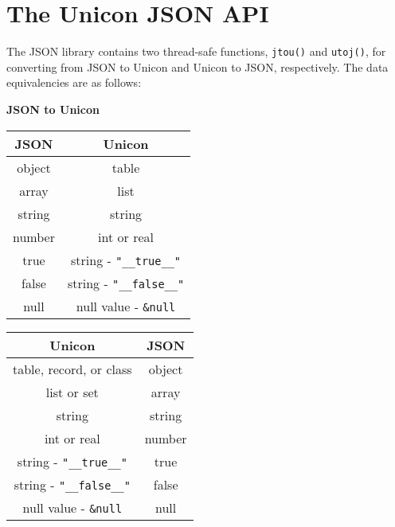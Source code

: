 \documentclass[letterpaper,12pt]{article}
\begin{document}
\pagebreak

\section{The Unicon JSON API}

The JSON library contains two thread-safe functions, {\tt jtou()} and 
{\tt utoj()}, for converting from JSON to Unicon and Unicon to JSON, 
respectively. The data equivalencies are as follows: 

\begin{center}
{\large\bf JSON to Unicon}
\end{center}

\begin{center}
\begin{tabular}{ c | c }
 JSON      & Unicon \\
 \hline
 object    & table \\
 array     & list \\
 string    & string \\
 number    & int or real \\
 true      & string - {\tt "\_\_true\_\_"} \\
 false     & string - {\tt "\_\_false\_\_"} \\
 null      & null value - {\tt \&null} \\

\end{tabular}
\end{center}

\vspace{1em}

\begin{center}
\end{center}

\begin{center}
\begin{tabular}{ c | c }
 Unicon                   & JSON\\
 \hline
 table, record, or class  & object \\
 list or set              & array  \\
 string                   & string \\
 int or real              & number \\
 string - {\tt "\_\_true\_\_"}  & true   \\
 string - {\tt "\_\_false\_\_"} & false  \\
 null value - {\tt \&null}& null   \\

\end{tabular}
\end{center}
\end{document}
